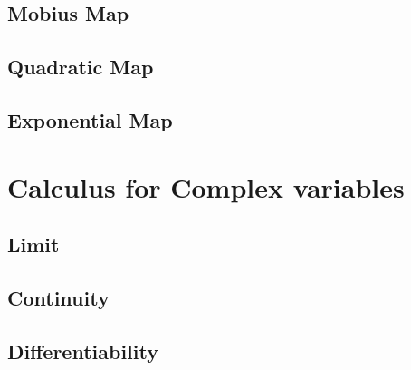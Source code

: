 \subsection{Mobius Map}

\subsection{Quadratic Map}

\subsection{Exponential Map}


\section{Calculus for Complex variables}

\subsection{Limit}

\subsection{Continuity}

\subsection{Differentiability}